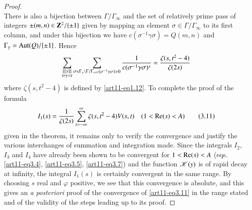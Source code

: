 \begin{proof}
$$$$
There is also a bijection between $\Gamma / \Gamma_\infty$ and the set of relatively prime pass of integers $\pm (m,n) \in \mathbf{Z}^2 / \{\pm 1\}$ given by mapping an element $\sigma \in \Gamma / \Gamma_\infty$ to its first column, and under this bijection we have $c(\sigma^{-1} \gamma \sigma) = Q (m,n)$ and $\Gamma_\gamma = \operatorname{Aut} (Q) /\{\pm 1\}$. Hence
$$
\sum\limits_{\substack{[[\gamma]]\\ tr \gamma = t}} \sum\limits_{\substack{\sigma \in \Gamma_\gamma \backslash \Gamma / \Gamma_\infty}\\ c(\sigma^{-1} \gamma \sigma) > 0} \frac{1}{c(\sigma^{-1} \gamma \sigma)^s} = \frac{\zeta(s, t^2 -4)}{\zeta (2s)}
$$
where $\zeta(s, t^2 -4)$ is defined by \eqref{art11-eq1.12}. To complete the proof of the formula
\begin{equation*}
I_1 (s) = \frac{1}{\zeta(2s)} \sum\limits^\infty_{t = - \infty} \zeta (s, t^2 -4) V (s,t) \quad (1 < \operatorname{Re} (s) < A)\tag{3.11}\label{art11-eq3.11}
\end{equation*}
given in the theorem, it remains only to verify the convergence and justify the various interchanges of summation and integration made. Since the integrals $I_2$, $I_3$ and $I_4$ have already been shown to be convergent for $1 < \operatorname{Re} (s) < A$ (eqs. \eqref{art11-eq3.4}, \eqref{art11-eq3.5}, \eqref{art11-eq3.7}) and the function $\mathscr{K}(y)$ is of rapid decay at infinity, the integral $I_1 (s)$ is certainly convergent in the same range. By choosing $s$ real and $\varphi$ positive, we see that this convergence is absolute, and this gives an \textit{a posteriori} proof of the convergence of \eqref{art11-eq3.11} in the range stated and of the validity of the steps leading up to its proof.
\end{proof}

